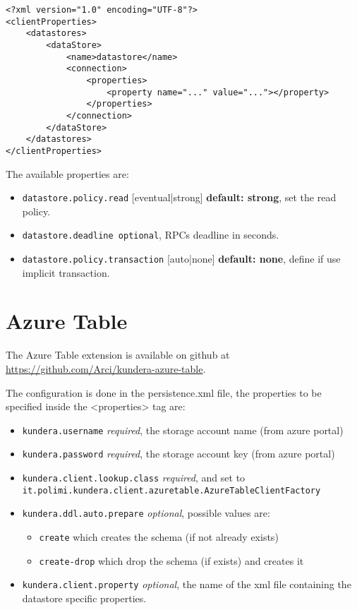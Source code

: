 \begin{verbatim}
<?xml version="1.0" encoding="UTF-8"?>
<clientProperties>
    <datastores>
        <dataStore>
            <name>datastore</name>
            <connection>
                <properties>
                    <property name="..." value="..."></property>
                </properties>
            </connection>
        </dataStore>
    </datastores>
</clientProperties>
\end{verbatim}

\noindent The available properties are:
\begin{itemize}
\item \texttt{datastore.policy.read} [eventual|strong] \textbf{default: strong}, set the read policy.
\item \texttt{datastore.deadline optional}, RPCs deadline in seconds.
\item \texttt{datastore.policy.transaction} [auto|none] \textbf{default: none}, define if use implicit transaction.

\end{itemize}

\section{Azure Table}
\label{appendix:table-config}
The Azure Table extension is available on github at \url{https://github.com/Arci/kundera-azure-table}.

\newparagraph The configuration is done in the persistence.xml file, the properties to be specified inside the <properties> tag are:
\begin{itemize}
\item \texttt{kundera.username} \textit{required}, the storage account name (from azure portal)
\item \texttt{kundera.password} \textit{required}, the storage account key (from azure portal)
\item \texttt{kundera.client.lookup.class} \textit{required}, and set to\\\texttt{it.polimi.kundera.client.azuretable.AzureTableClientFactory}
\item \texttt{kundera.ddl.auto.prepare} \textit{optional}, possible values are:
\begin{itemize}
\item \texttt{create} which creates the schema (if not already exists)
\item \texttt{create-drop} which drop the schema (if exists) and creates it
\end{itemize}
\item \texttt{kundera.client.property} \textit{optional}, the name of the xml file containing the datastore specific properties.
\end{itemize}

